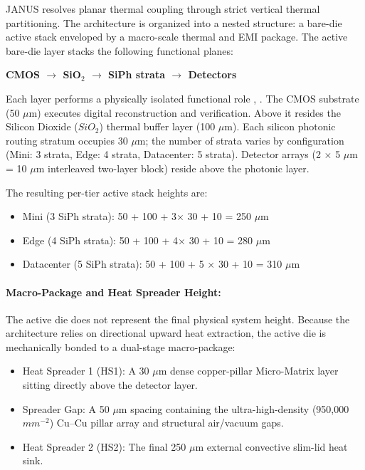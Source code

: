 \documentclass[journal]{IEEEtran}
\begin{document}
JANUS resolves planar thermal coupling through strict vertical thermal partitioning. The architecture is organized into a nested structure: a bare-die active stack enveloped by a macro-scale thermal and EMI package. The active bare-die layer stacks the following functional
planes:

\textbf{CMOS $\rightarrow$ SiO$_2$ $\rightarrow$ SiPh strata $\rightarrow$ Detectors}

Each layer performs a physically isolated functional role \cite{Atabaki2018}, \cite{Fenouillet2009}. The CMOS substrate (50 $\mu$m) executes digital reconstruction and verification. Above it resides the Silicon Dioxide ($SiO_2$) thermal buffer layer (100 $\mu$m). Each silicon photonic routing stratum occupies 30 $\mu$m; the number of strata varies by configuration (Mini: 3 strata, Edge: 4 strata, Datacenter: 5 strata). Detector arrays (2 $\times$ 5 $\mu$m = 10 $\mu$m interleaved two-layer block) reside above the photonic layer.

The resulting per-tier active stack heights are:
\begin{itemize}
\item  Mini (3 SiPh strata): 50 + 100 + 3$\times$ 30 + 10 = 250 $\mu$m
\item  Edge (4 SiPh strata): 50 + 100 + 4$\times$ 30 + 10 = 280 $\mu$m
\item  Datacenter (5 SiPh strata): 50 + 100 + 5 $\times$ 30 + 10 = 310 $\mu$m
\end{itemize}

\paragraph{\textbf{Macro-Package and Heat Spreader Height:}}

The active die does not represent the final physical system height. Because the architecture relies on directional upward heat extraction, the active die is mechanically bonded to a dual-stage macro-package:

\begin{itemize}
\item Heat Spreader 1 (HS1): A 30 $\mu$m dense copper-pillar Micro-Matrix layer sitting directly above the detector layer.
\item Spreader Gap: A 50 $\mu$m spacing containing the ultra-high-density (950,000 $mm^{-2}$) Cu--Cu pillar array and structural air/vacuum gaps.
\item Heat Spreader 2 (HS2): The final 250 $\mu$m external convective slim-lid heat sink.
\end{itemize}
\end{document}
